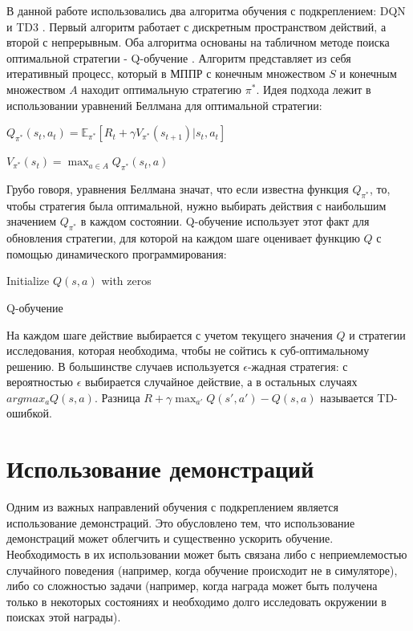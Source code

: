 \documentclass{mipt-thesis-bs}
\begin{document}
В данной работе использовались два алгоритма обучения с подкреплением: DQN \cite{dqn} и TD3 \cite{td3}. Первый алгоритм работает с дискретным пространством действий, а второй с непрерывным. Оба алгоритма основаны на табличном методе поиска оптимальной стратегии - Q-обучение \cite{Q-learning}. Алгоритм представляет из себя итеративный процесс, который в МППР с конечным множеством $S$ и конечным множеством $A$ находит оптимальную стратегию $\pi^*$. Идея подхода лежит в использовании уравнений Беллмана для оптимальной стратегии:
\begin{center}
$Q_{\pi^*}(s_t, a_t) = \mathbb{E}_{\pi^*}[R_{t} + \gamma V_{\pi^*}(s_{t+1})| s_t, a_t]$

$V_{\pi^*}(s_t) = \max_{a\in A}Q_{\pi^*}(s_t, a)$
\end{center}

Грубо говоря, уравнения Беллмана значат, что если известна функция $Q_{\pi^*}$, то, чтобы стратегия была оптимальной, нужно выбирать действия с наибольшим значением $Q_{\pi^*}$ в каждом состоянии. Q-обучение использует этот факт для обновления стратегии, для которой на каждом шаге оценивает функцию $Q$ с помощью динамического программирования: 

\begin{algorithm}[H]
\SetAlgoLined
Initialize $Q(s, a)$ with zeros\;
\caption{Q-обучение}
\end{algorithm}

На каждом шаге действие выбирается с учетом текущего значения $Q$ и стратегии исследования, которая необходима, чтобы не сойтись к суб-оптимальному решению. В большинстве случаев используется $\epsilon$-жадная стратегия: с вероятностью $\epsilon$ выбирается случайное действие, а в остальных случаях $argmax_aQ(s,a)$. Разница $R+\gamma \max _{a'} Q(s', a')-Q(s, a)$ называется TD-ошибкой.

\section{Использование демонстраций}

Одним из важных направлений обучения с подкреплением является использование демонстраций. Это обусловлено тем, что использование демонстраций может облегчить и существенно ускорить обучение. Необходимость в их использовании может быть связана либо с неприемлемостью случайного поведения (например, когда обучение происходит не в симуляторе), либо со сложностью задачи (например, когда награда может быть получена только в некоторых состояниях и необходимо долго исследовать окружении в поисках этой награды).
\end{document}

